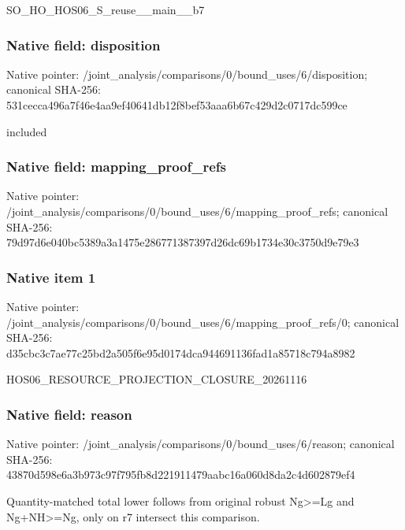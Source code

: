 \documentclass[10pt,a4paper]{article}
\begin{document}
\begingroup\raggedright\sloppy SO\_\allowbreak{}HO\_\allowbreak{}HOS06\_\allowbreak{}S\_\allowbreak{}reuse\_\allowbreak{}\_\allowbreak{}main\_\allowbreak{}\_\allowbreak{}b7\par\endgroup

\subsubsection{Native field: disposition}
Native pointer: /joint\_\allowbreak{}analysis/comparisons/0/bound\_\allowbreak{}uses/6/disposition; canonical SHA-256: 531cecca496a7f46e4aa9ef40641db12f8bef53aaa6b67c429d2c0717dc599ce

\begingroup\raggedright\sloppy included\par\endgroup

\subsubsection{Native field: mapping\_\allowbreak{}proof\_\allowbreak{}refs}
Native pointer: /joint\_\allowbreak{}analysis/comparisons/0/bound\_\allowbreak{}uses/6/mapping\_\allowbreak{}proof\_\allowbreak{}refs; canonical SHA-256: 79d97d6e040bc5389a3a1475e286771387397d26dc69b1734e30c3750d9e79e3

\subsubsection{Native item 1}
Native pointer: /joint\_\allowbreak{}analysis/comparisons/0/bound\_\allowbreak{}uses/6/mapping\_\allowbreak{}proof\_\allowbreak{}refs/0; canonical SHA-256: d35cbc3c7ae77c25bd2a505f6e95d0174dca944691136fad1a85718c794a8982

\begingroup\raggedright\sloppy HOS06\_\allowbreak{}RESOURCE\_\allowbreak{}PROJECTION\_\allowbreak{}CLOSURE\_\allowbreak{}20261116\par\endgroup

\subsubsection{Native field: reason}
Native pointer: /joint\_\allowbreak{}analysis/comparisons/0/bound\_\allowbreak{}uses/6/reason; canonical SHA-256: 43870d598e6a3b973c97f795fb8d221911479aabc16a060d8da2c4d602879ef4

\begingroup\raggedright\sloppy Quantity-matched total lower follows from original robust Ng>=\allowbreak{}Lg and Ng+NH>=\allowbreak{}Ng,\allowbreak{} only on r7 intersect this comparison.\par\endgroup
\end{document}
